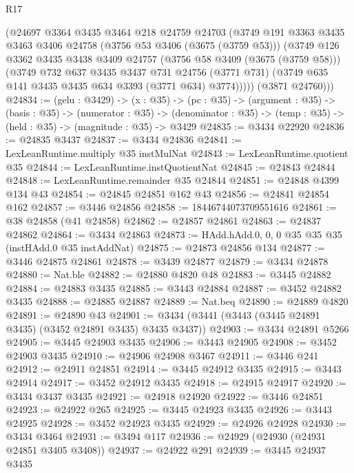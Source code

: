 \begin{lexlean}{R17}
\begin{coremodule}
        (@24697
          @3364
          @3435
          @3464
          @218
          @24759
          @24703
          (@3749
            @191
            @3363
            @3435
            @3463
            @3406
            @24758
            (@3756 @53 @3406 (@3675 (@3759 @53)))
            (@3749
              @126
              @3362
              @3435
              @3438
              @3409
              @24757
              (@3756 @58 @3409 (@3675 (@3759 @58)))
              (@3749
                @732
                @637
                @3435
                @3437
                @731
                @24756
                (@3771 @731)
                (@3749 @635 @141 @3435 @3435 @634 @3393 (@3771 @634) @3774)))))
        (@3871 @24760)))
@24834 := (gelu : @3429) ->
  (x : @35) ->
  (pc : @35) ->
  (argument : @35) ->
  (basis : @35) ->
  (numerator : @35) ->
  (denominator : @35) -> (temp : @35) -> (held : @35) -> (magnitude : @35) -> @3429
@24835 := @3434 @22920
@24836 := @24835 @3437
@24837 := @3434 @24836
@24841 := LexLeanRuntime.multiply @35 instMulNat
@24843 := LexLeanRuntime.quotient @35
@24844 := LexLeanRuntime.instQuotientNat
@24845 := @24843 @24844
@24848 := LexLeanRuntime.remainder @35 @24844
@24851 := @24848 @4399 @134 @43
@24854 := @24845 @24851 @162 @43
@24856 := @24841 @24854 @162
@24857 := @3446 @24856
@24858 := 18446744073709551616
@24861 := @38 @24858 (@41 @24858)
@24862 := @24857 @24861
@24863 := @24837 @24862
@24864 := @3434 @24863
@24873 := HAdd.hAdd.{0, 0, 0} @35 @35 @35 (instHAdd.{0} @35 instAddNat)
@24875 := @24873 @24856 @134
@24877 := @3446 @24875 @24861
@24878 := @3439 @24877
@24879 := @3434 @24878
@24880 := Nat.ble
@24882 := @24880 @4820 @48
@24883 := @3445 @24882
@24884 := @24883 @3435
@24885 := @3443 @24884
@24887 := @3452 @24882 @3435
@24888 := @24885 @24887
@24889 := Nat.beq
@24890 := @24889 @4820
@24891 := @24890 @43
@24901 := @3434 (@3441 (@3443 (@3445 @24891 @3435) (@3452 @24891 @3435) @3435 @3437))
@24903 := @3434 @24891 @5266
@24905 := @3445 @24903 @3435
@24906 := @3443 @24905
@24908 := @3452 @24903 @3435
@24910 := @24906 @24908 @3467
@24911 := @3446 @241
@24912 := @24911 @24851
@24914 := @3445 @24912 @3435
@24915 := @3443 @24914
@24917 := @3452 @24912 @3435
@24918 := @24915 @24917
@24920 := @3434 @3437 @3435
@24921 := @24918 @24920
@24922 := @3446 @24851
@24923 := @24922 @265
@24925 := @3445 @24923 @3435
@24926 := @3443 @24925
@24928 := @3452 @24923 @3435
@24929 := @24926 @24928
@24930 := @3434 @3464
@24931 := @3494 @117
@24936 := @24929 (@24930 (@24931 @24851 @3405 @3408))
@24937 := @24922 @291
@24939 := @3445 @24937 @3435

\end{coremodule}
\end{lexlean}
